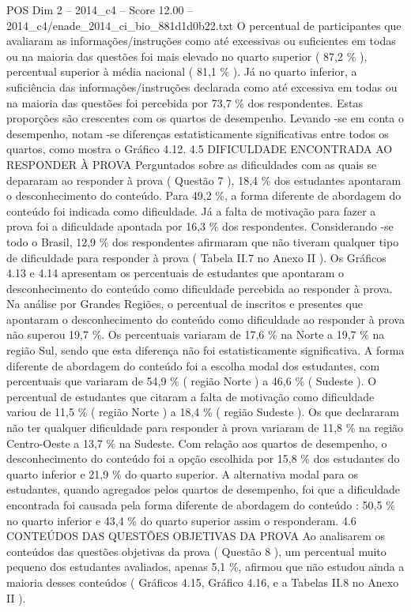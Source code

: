 \begin{textsample}{POS Dim 2 – 2014\_c4 – Score 12.00 – 2014\_c4/enade\_2014\_ci\_bio\_881d1d0b22.txt}
O percentual de participantes que avaliaram as informações/instruções como até excessivas ou suficientes em todas ou na maioria das questões foi mais elevado no quarto superior ( 87,2 \% ), percentual superior à média nacional ( 81,1 \% ).
Já no quarto inferior, a suficiência das informações/instruções declarada como até excessiva em todas ou na maioria das questões foi percebida por 73,7 \% dos respondentes.
Estas proporções são crescentes com os quartos de desempenho.
Levando -se em conta o desempenho, notam -se diferenças estatisticamente significativas entre todos os quartos, como mostra o Gráfico 4.12. 4.5 DIFICULDADE ENCONTRADA AO RESPONDER À PROVA Perguntados sobre as dificuldades com as quais se depararam ao responder à prova ( Questão 7 ), 18,4 \% dos estudantes apontaram o desconhecimento do conteúdo.
Para 49,2 \%, a forma diferente de abordagem do conteúdo foi indicada como dificuldade.
Já a falta de motivação para fazer a prova foi a dificuldade apontada por 16,3 \% dos respondentes.
Considerando -se todo o Brasil, 12,9 \% dos respondentes afirmaram que não tiveram qualquer tipo de dificuldade para responder à prova ( Tabela II.7 no Anexo II ).
Os Gráficos 4.13 e 4.14 apresentam os percentuais de estudantes que apontaram o desconhecimento do conteúdo como dificuldade percebida ao responder à prova.
Na análise por Grandes Regiões, o percentual de inscritos e presentes que apontaram o desconhecimento do conteúdo como dificuldade ao responder à prova não superou 19,7 \%.
Os percentuais variaram de 17,6 \% na Norte a 19,7 \% na região Sul, sendo que esta diferença não foi estatisticamente significativa.
A forma diferente de abordagem do conteúdo foi a escolha modal dos estudantes, com percentuais que variaram de 54,9 \% ( região Norte ) a 46,6 \% ( Sudeste ).
O percentual de estudantes que citaram a falta de motivação como dificuldade variou de 11,5 \% ( região Norte ) a 18,4 \% ( região Sudeste ).
Os que declararam não ter qualquer dificuldade para responder à prova variaram de 11,8 \% na região Centro-Oeste a 13,7 \% na Sudeste.
Com relação aos quartos de desempenho, o desconhecimento do conteúdo foi a opção escolhida por 15,8 \% dos estudantes do quarto inferior e 21,9 \% do quarto superior.
A alternativa modal para os estudantes, quando agregados pelos quartos de desempenho, foi que a dificuldade encontrada foi causada pela forma diferente de abordagem do conteúdo : 50,5 \% no quarto inferior e 43,4 \% do quarto superior assim o responderam. 4.6 CONTEÚDOS DAS QUESTÕES OBJETIVAS DA PROVA Ao analisarem os conteúdos das questões objetivas da prova ( Questão 8 ), um percentual muito pequeno dos estudantes avaliados, apenas 5,1 \%, afirmou que não estudou ainda a maioria desses conteúdos ( Gráficos 4.15, Gráfico 4.16, e a Tabelas II.8 no Anexo II ).

\end{textsample}
